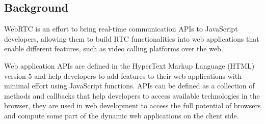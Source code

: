 %
%
%

\subsection{Background}

WebRTC is an effort to bring real-time communication APIs to JavaScript developers, allowing them to build RTC functionalities into web applications that enable different features, such as video calling platforms over the web. 

Web application APIs are defined in the HyperText Markup Language (HTML)  version 5 and help developers to add features to their web applications with minimal effort using JavaScript functions. APIs can be defined as a collection of methods and callbacks that help developers to access available technologies in the browser, they are used in web development to access the full potential of browsers and compute some part of the dynamic web applications on the client side.

